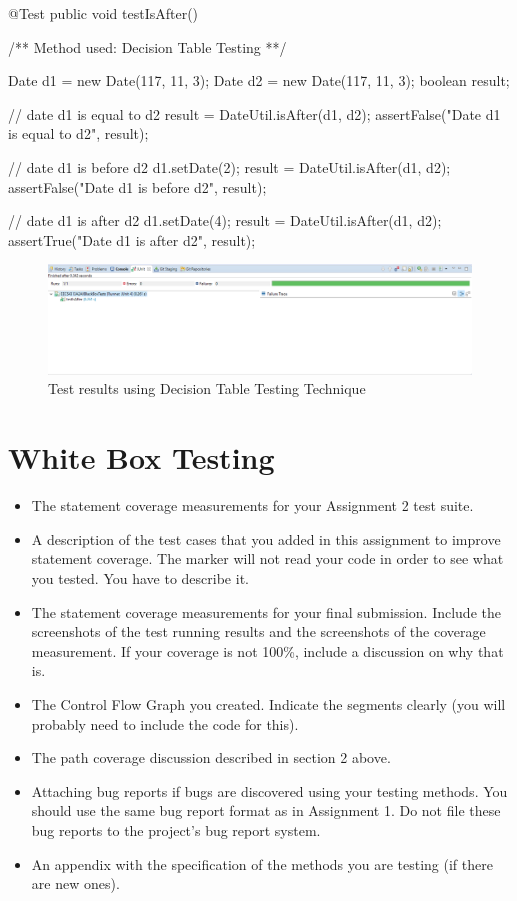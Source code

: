 \documentclass[fontsize=12pt,paper=letter,twoside]{scrartcl}
\begin{document}
\newpage
\begin{code}
	@Test
	public void testIsAfter() {
		/** Method used: Decision Table Testing **/
		
		Date d1 = new Date(117, 11, 3);
		Date d2 = new Date(117, 11, 3);
		boolean result;
		
		// date d1 is equal to d2
		result = DateUtil.isAfter(d1, d2);
		assertFalse("Date d1 is equal to d2", result);
		
		// date d1 is before d2
		d1.setDate(2);
		result = DateUtil.isAfter(d1, d2);
		assertFalse("Date d1 is before d2", result);
		
		// date d1 is after d2
		d1.setDate(4);
		result = DateUtil.isAfter(d1, d2);
		assertTrue("Date d1 is after d2", result);
	}
\end{code}

\begin{figure}[!htb]
\begin{center}
\includegraphics[width=.99\textwidth]{images/bbt/dtt.png}
\end{center}
\caption{Test results using Decision Table Testing Technique}
\label{fig:bbt_dtt}
\end{figure}

\newpage
\section{White Box Testing}

\begin{itemize}
\item The statement coverage measurements for your Assignment 2 test suite.
\item A description of the test cases that you added in this assignment to improve statement
coverage. The marker will not read your code in order to see what you tested. You have to
describe it.
\item The statement coverage measurements for your final submission. Include the screenshots of
the test running results and the screenshots of the coverage measurement. If your coverage is
not 100\%, include a discussion on why that is.
\item The Control Flow Graph you created. Indicate the segments clearly (you will probably need
to include the code for this).
\item The path coverage discussion described in section 2 above.
\item Attaching bug reports if bugs are discovered using your testing methods. You should use the
same bug report format as in Assignment 1. Do not file these bug reports to the project’s bug
report system.
\item An appendix with the specification of the methods you are testing (if there are new ones). 
\end{itemize}
\end{document}
